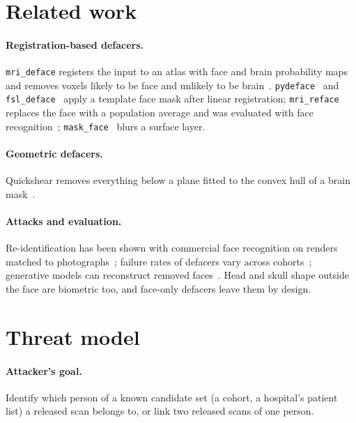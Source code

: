 \documentclass[11pt]{article}
\newcommand{\code}[1]{\texttt{#1}}
\begin{document}
\section{Related work}
\label{sec:related}

\paragraph{Registration-based defacers.} \code{mri\_deface} registers the
input to an atlas with face and brain probability maps and removes voxels
likely to be face and unlikely to be brain~\cite{bischoffgrethe2007}.
\code{pydeface}~\cite{pydeface} and \code{fsl\_deface}~\cite{alfaroalmagro2018}
apply a template face mask after linear registration; \code{mri\_reface}
replaces the face with a population average and was evaluated with face
recognition~\cite{schwarz2021}; \code{mask\_face}~\cite{milchenko2013} blurs a
surface layer.

\paragraph{Geometric defacers.} Quickshear removes everything below a
plane fitted to the convex hull of a brain mask~\cite{schimke2011}.

\paragraph{Attacks and evaluation.} Re-identification has been shown with
commercial face recognition on renders matched to
photographs~\cite{schwarz2019,schwarz2021}; failure rates of defacers vary
across cohorts~\cite{theyers2021}; generative models can reconstruct removed
faces~\cite{abramian2019}. Head and skull shape outside the face are
biometric too, and face-only defacers leave them by design.

\section{Threat model}
\label{sec:threat}

\paragraph{Attacker's goal.} Identify which person of a known candidate set
(a cohort, a hospital's patient list) a released scan belongs to, or link two
released scans of one person.
\end{document}
